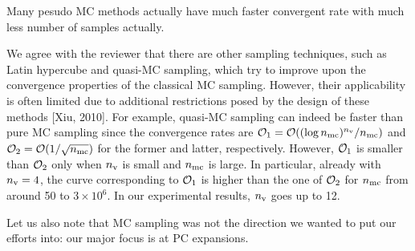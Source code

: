\begin{reviewer}
[Comment 9] Many pesudo MC methods actually have much faster convergent rate with much less number of samples actually.
\end{reviewer}
\begin{authors}
We agree with the reviewer that there are other sampling techniques, such as Latin hypercube and quasi-MC sampling, which try to improve upon the convergence properties of the classical MC sampling.
However, their applicability is often limited due to additional restrictions posed by the design of these methods [Xiu, 2010].
For example, quasi-MC sampling can indeed be faster than pure MC sampling since the convergence rates are $\mathcal{O}_1 = \mathcal{O}((\log{n_\text{mc}})^{n_\text{v}} / {n_\text{mc}})$ and $\mathcal{O}_2 = \mathcal{O}(1 / \sqrt{{n_\text{mc}}})$ for the former and latter, respectively.
However, $\mathcal{O}_1$ is smaller than $\mathcal{O}_2$ only when ${n_\text{v}}$ is small and ${n_\text{mc}}$ is large.
In particular, already with ${n_\text{v}} = 4$, the curve corresponding to $\mathcal{O}_1$ is higher than the one of $\mathcal{O}_2$ for ${n_\text{mc}}$ from around 50 to $3 \times 10^6$.
In our experimental results, ${n_\text{v}}$ goes up to 12.

Let us also note that MC sampling was not the direction we wanted to put our efforts into: our major focus is at PC expansions.

\begin{actions}
\end{actions}
\end{authors}

